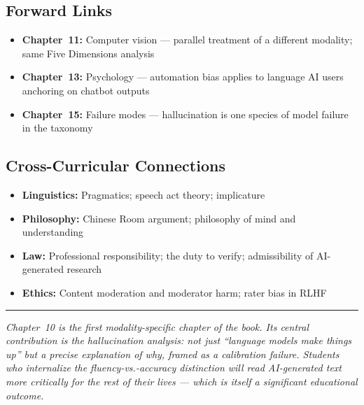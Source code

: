\subsection{Forward Links}
\begin{itemize}
    \item \textbf{Chapter~11:} Computer vision --- parallel treatment of a different modality; same Five Dimensions analysis
    \item \textbf{Chapter~13:} Psychology --- automation bias applies to language AI users anchoring on chatbot outputs
    \item \textbf{Chapter~15:} Failure modes --- hallucination is one species of model failure in the taxonomy
\end{itemize}

\subsection{Cross-Curricular Connections}
\begin{itemize}
    \item \textbf{Linguistics:} Pragmatics; speech act theory; implicature
    \item \textbf{Philosophy:} Chinese Room argument; philosophy of mind and understanding
    \item \textbf{Law:} Professional responsibility; the duty to verify; admissibility of AI-generated research
    \item \textbf{Ethics:} Content moderation and moderator harm; rater bias in RLHF
\end{itemize}

\bigskip
\begin{center}
\rule{0.5\textwidth}{0.4pt}
\end{center}
\bigskip

\noindent\textit{Chapter~10 is the first modality-specific chapter of the book. Its central contribution is the hallucination analysis: not just ``language models make things up'' but a precise explanation of why, framed as a calibration failure. Students who internalize the fluency-vs.-accuracy distinction will read AI-generated text more critically for the rest of their lives --- which is itself a significant educational outcome.}
